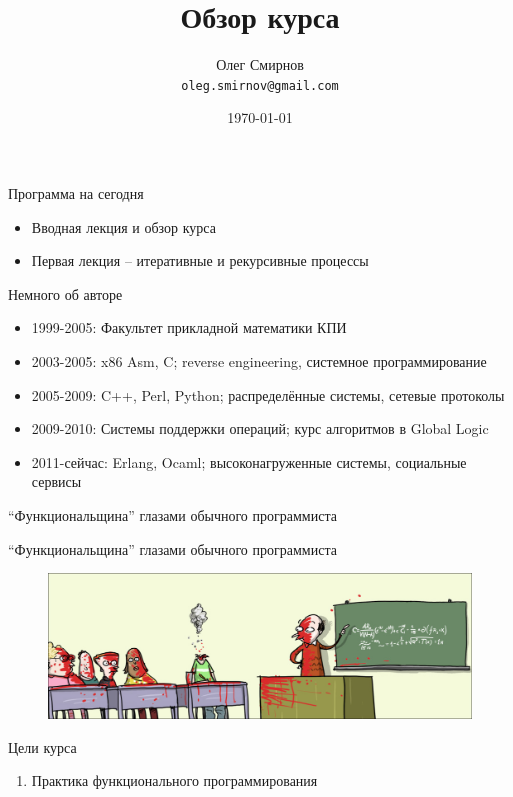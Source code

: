 \documentclass{beamer}
\title[Введение в функциональное программирование]{Обзор курса}
\author{Олег Смирнов\\
\texttt{oleg.smirnov@gmail.com}}
\institute{УНК ``ИПСА'' НТУУ ``КПИ''}
\date{\today}
\begin{document}
\begin{frame}
\titlepage
\end{frame}

\begin{frame}{Программа на сегодня}
  \begin{itemize}
    \item Вводная лекция и обзор курса
    \item Первая лекция -- итеративные и рекурсивные процессы
  \end{itemize}
\end{frame}

\begin{frame}{Немного об авторе}
  \begin{itemize}
  \item 1999-2005: Факультет прикладной математики КПИ
  \item 2003-2005: x86 Asm, C; reverse engineering, системное программирование
  \item 2005-2009: C++, Perl, Python; распределённые системы, сетевые протоколы
  \item 2009-2010: Системы поддержки операций; курс алгоритмов в Global Logic
  \item 2011-сейчас: Erlang, Ocaml; высоконагруженные системы, социальные сервисы
  \end{itemize}
\end{frame}

\begin{frame}{``Функциональщина'' глазами обычного программиста}
  
\end{frame}

\begin{frame}{``Функциональщина'' глазами обычного программиста}
\begin{figure}
   \includegraphics[scale=0.44]{lecture0/Matematik-Hjerne-Formel-WM_strip_DK_20090625.eps}
\end{figure}
\end{frame}

\begin{frame}{Цели курса}
  \begin{enumerate}
  \item Практика функционального программирования
  \end{enumerate}
\end{frame}
\end{document}
